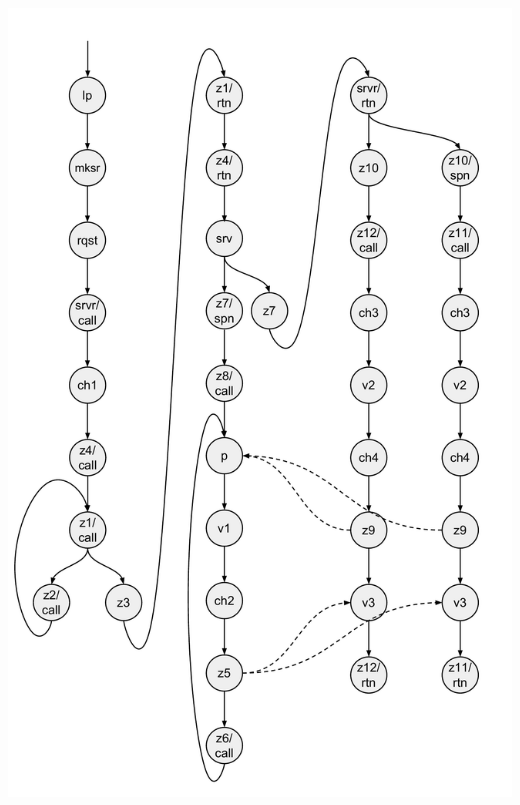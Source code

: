 \documentclass{article}
\begin{document}
  \includegraphics[scale=0.4]{cml_graph.pdf}
  
\end{document}
